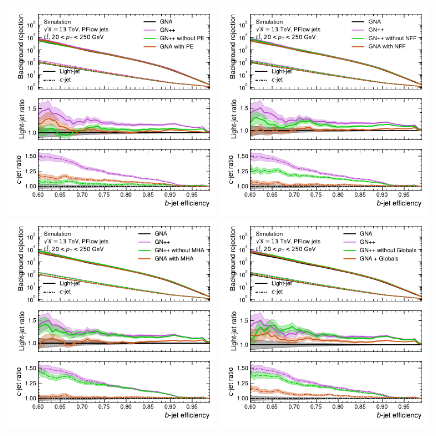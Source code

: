 \begin{figure}[ht]
    \centering
    \includegraphics[width=0.49\textwidth]{figures/flavour_tagging/b_roc_ttbar_edge.pdf}
    \includegraphics[width=0.49\textwidth]{figures/flavour_tagging/b_roc_ttbar_node.pdf}
    \includegraphics[width=0.49\textwidth]{figures/flavour_tagging/b_roc_ttbar_mha.pdf}
    \includegraphics[width=0.49\textwidth]{figures/flavour_tagging/b_roc_ttbar_pg.pdf}

\end{figure}
